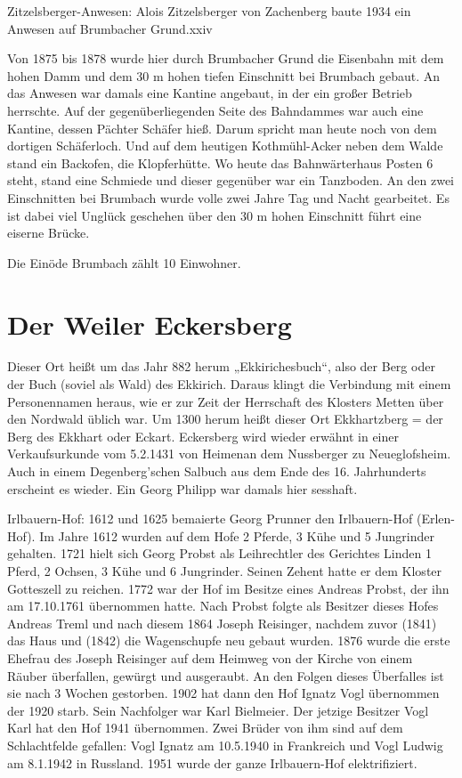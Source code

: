 \documentclass[12pt,a4pager]{book}
\begin{document}
Zitzelsberger-Anwesen: Alois Zitzelsberger von Zachenberg baute 1934 ein Anwesen
auf Brumbacher Grund.xxiv

Von 1875 bis 1878 wurde hier durch Brumbacher Grund die Eisenbahn mit dem hohen
Damm und dem 30 m hohen tiefen Einschnitt bei Brumbach gebaut. An das Anwesen
war damals eine Kantine angebaut, in der ein großer Betrieb herrschte. Auf der
gegenüberliegenden Seite des Bahndammes war auch eine Kantine, dessen Pächter
Schäfer hieß. Darum spricht man heute noch von dem dortigen Schäferloch. Und auf
dem heutigen Kothmühl-Acker neben dem Walde stand ein Backofen, die
Klopferhütte. Wo heute das Bahnwärterhaus Posten 6 steht, stand eine Schmiede
und dieser gegenüber war ein Tanzboden. An den zwei Einschnitten bei Brumbach
wurde volle zwei Jahre Tag und Nacht gearbeitet. Es ist dabei viel Unglück
geschehen über den 30 m hohen Einschnitt führt eine eiserne Brücke.

Die Einöde Brumbach zählt 10 Einwohner.

\section{Der Weiler Eckersberg}

Dieser Ort heißt um das Jahr 882 herum „Ekkirichesbuch“, also der Berg oder der
Buch (soviel als Wald) des Ekkirich. Daraus klingt die Verbindung mit einem
Personennamen heraus, wie er zur Zeit der Herrschaft des Klosters Metten über
den Nordwald üblich war. Um 1300 herum heißt dieser Ort Ekkhartzberg = der Berg
des Ekkhart oder Eckart. Eckersberg wird wieder erwähnt in einer Verkaufsurkunde
vom 5.2.1431 von Heimenan dem Nussberger zu Neueglofsheim. Auch in einem
Degenberg'schen Salbuch aus dem Ende des 16. Jahrhunderts erscheint es wieder.
Ein Georg Philipp war damals hier sesshaft.

Irlbauern-Hof: 1612 und 1625 bemaierte Georg Prunner den Irlbauern-Hof
(Erlen-Hof). Im Jahre 1612 wurden auf dem Hofe 2 Pferde, 3 Kühe und 5 Jungrinder
gehalten. 1721 hielt sich Georg Probst als Leihrechtler des Gerichtes Linden 1
Pferd, 2 Ochsen, 3 Kühe und 6 Jungrinder. Seinen Zehent hatte er dem Kloster
Gotteszell zu reichen. 1772 war der Hof im Besitze eines Andreas Probst, der ihn
am 17.10.1761 übernommen hatte. Nach Probst folgte als Besitzer dieses Hofes
Andreas Treml und nach diesem 1864 Joseph Reisinger, nachdem zuvor (1841) das
Haus und (1842) die Wagenschupfe neu gebaut wurden. 1876 wurde die erste Ehefrau
des Joseph Reisinger auf dem Heimweg von der Kirche von einem Räuber überfallen,
gewürgt und ausgeraubt. An den Folgen dieses Überfalles ist sie nach 3 Wochen
gestorben. 1902 hat dann den Hof Ignatz Vogl übernommen der 1920 starb. Sein
Nachfolger war Karl Bielmeier. Der jetzige Besitzer Vogl Karl hat den Hof 1941
übernommen. Zwei Brüder von ihm sind auf dem Schlachtfelde gefallen: Vogl Ignatz
am 10.5.1940 in Frankreich und Vogl Ludwig am 8.1.1942 in Russland. 1951 wurde
der ganze Irlbauern-Hof elektrifiziert.
\end{document}
